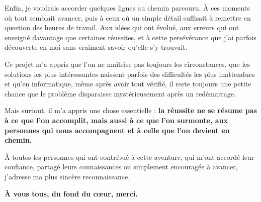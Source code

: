 Enfin, je voudrais accorder quelques lignes au chemin parcouru. À ces moments où tout semblait avancer, puis à ceux où un simple détail suffisait à remettre en question des heures de travail. Aux idées qui ont évolué, aux erreurs qui ont enseigné davantage que certaines réussites, et à cette persévérance que j’ai parfois découverte en moi sans vraiment savoir qu’elle s’y trouvait.

Ce projet m’a appris que l’on ne maîtrise pas toujours les circonstances, que les solutions les plus intéressantes naissent parfois des difficultés les plus inattendues et qu’en informatique, même après avoir tout vérifié, il reste toujours une petite chance que le problème disparaisse mystérieusement après un redémarrage.

Mais surtout, il m’a appris une chose essentielle : \textbf{la réussite ne se résume pas à ce que l’on accomplit, mais aussi à ce que l’on surmonte, aux personnes qui nous accompagnent et à celle que l’on devient en chemin.}

À toutes les personnes qui ont contribué à cette aventure, qui m’ont accordé leur confiance, partagé leurs connaissances ou simplement encouragée à avancer, j’adresse ma plus sincère reconnaissance.

\textbf{À vous tous, du fond du cœur, merci.}
